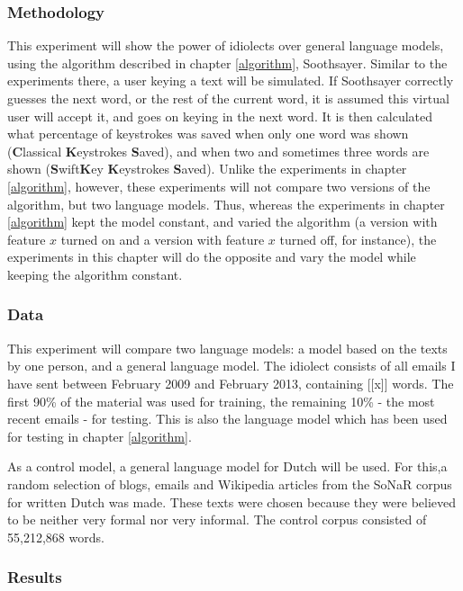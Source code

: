 \documentclass[12pt]{article}
\begin{document}
\subsubsection{Methodology}
This experiment will show the power of idiolects over general language models, using the algorithm described in chapter \ref{algorithm}, Soothsayer. Similar to the experiments there, a user keying a text will be simulated. If Soothsayer correctly guesses the next word, or the rest of the current word, it is assumed this virtual user will accept it, and goes on keying in the next word. It is then calculated what percentage of keystrokes was saved when only one word was shown (\textbf{C}lassical \textbf{K}eystrokes \textbf{S}aved), and when two and sometimes three words are shown (\textbf{S}wift\textbf{K}ey \textbf{K}eystrokes \textbf{S}aved). Unlike the experiments in chapter \ref{algorithm}, however, these experiments will not compare two versions of the algorithm, but two language models. Thus, whereas the experiments in chapter \ref{algorithm} kept the model constant, and varied the algorithm (a version with feature $x$ turned on and a version with feature $x$ turned off, for instance), the experiments in this chapter will do the opposite and vary the model while keeping the algorithm constant.

\subsubsection{Data} \label{data_simple}
This experiment will compare two language models: a model based on the texts by one person, and a general language model. The idiolect consists of all emails I have sent between February 2009 and February 2013, containing [[x]] words. The first 90\% of the material was used for training, the remaining 10\% - the most recent emails - for testing. This is also the language model which has been used for testing in chapter \ref{algorithm}. 

As a control model, a general language model for Dutch will be used. For this,a random selection of blogs, emails and Wikipedia articles from the SoNaR corpus for written Dutch  was made. These texts were chosen because they were believed to be neither very formal nor very informal. The control corpus consisted of 55,212,868 words.


\subsubsection{Results}
\end{document}
